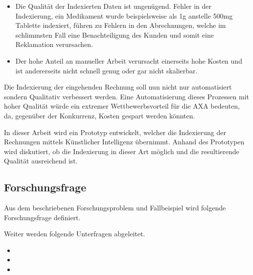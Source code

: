 \documentclass[12pt, twoside, table]{extarticle}
\begin{document}
\begin{itemize}
    \item Die Qualität der Indexierten Daten ist ungenügend. Fehler in der Indexierung, ein Medikament wurde beispielsweise als 1g anstelle 500mg Tablette indexiert, führen zu Fehlern in den Abrechnungen, welche im schlimmsten Fall eine Benachteiligung des Kunden und somit eine Reklamation verursachen. 
    \item Der hohe Anteil an manueller Arbeit verursacht einerseits hohe Kosten und ist andererseits nicht schnell genug oder gar nicht skalierbar.
\end{itemize}

Die Indexierung der eingehenden Rechnung soll nun nicht nur automatisiert sondern Qualitativ verbessert werden. Eine Automatisierung dieses Prozessen mit hoher Qualität würde ein extremer Wettbewerbsvorteil für die AXA bedeuten, da, gegenüber der Konkurrenz, Kosten gespart werden könnten.  

In dieser Arbeit wird ein Prototyp entwickelt, welcher die Indexierung der Rechnungen mittels Künstlicher Intelligenz übernimmt. Anhand des Prototypen wird diskutiert, ob die Indexierung in dieser Art möglich und die resultierende Qualität ausreichend ist.

\subsection{Forschungsfrage}

Aus dem beschriebenen Forschungsproblem und Fallbeispiel wird folgende Forschungsfrage definiert.

{
    \medskip
    \setlength{\fboxsep}{1em}
    \noindent{}
    \medskip
}

Weiter werden folgende Unterfragen abgeleitet.

\begin{itemize}
    \item {}
    \item {}
    \item {}
\end{itemize}

\newpage

\end{document}
